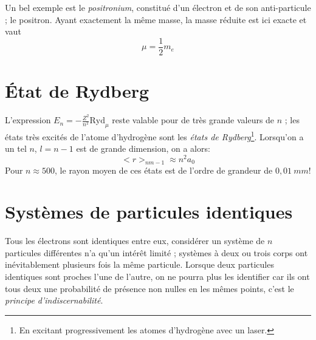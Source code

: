 \documentclass	[11pt, a4paper, openany]{book}
\begin{document}
Un bel exemple est le \textit{positronium}, constitué d'un électron et de son anti-particule ; le positron. Ayant exactement la même masse, la masse réduite est ici exacte et vaut
\begin{equation}
\mu = \frac{1}{2}m_e
\end{equation}

\section{État de Rydberg}
L'expression $E_n = -\frac{Z^2}{n^2}\text{Ryd}_\mu$ reste valable pour de très grande valeurs de $n$ ; les états très excités de l'atome d'hydrogène sont les \textit{états de Rydberg}\footnote{En excitant progressivement les atomes d'hydrogène avec un laser.}. Lorsqu'on a un tel $n$, $l=n-1$ est de grande dimension, on a alors:
\begin{equation}
<r>_{nm-1} \approx n^2a_0
\end{equation}
Pour $n\approx 500$, le rayon moyen de ces états est de l'ordre de grandeur de $0,01\ mm$!

\section{Systèmes de particules identiques}
Tous les électrons sont identiques entre eux, considérer un système de $n$ particules différentes n'a qu'un intérêt limité ; systèmes à deux ou trois corps ont inévitablement plusieurs fois la même particule. Lorsque deux particules identiques sont proches l'une de l'autre, on ne pourra plus les identifier car ils ont tous deux une probabilité de présence non nulles en les mêmes points, c'est le \textit{principe d'indiscernabilité}.\\
\end{document}

